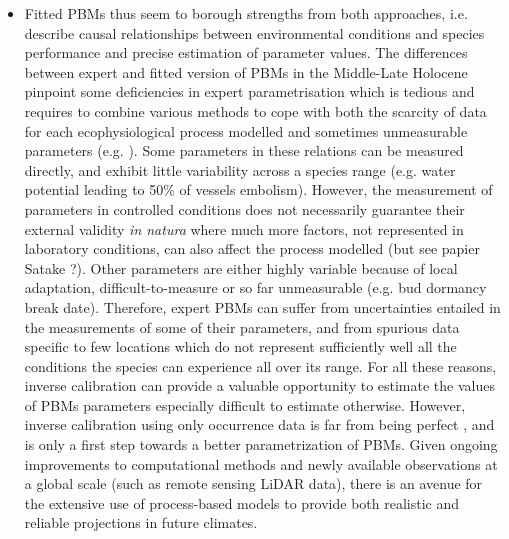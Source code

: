 \documentclass[pdflatex, sn-nature]{sn-jnl}%
\begin{document}
\begin{itemize}
\item Fitted PBMs thus seem to borough strengths from both approaches, i.e. describe causal relationships between environmental conditions and species performance and precise estimation of parameter values. The differences between expert and fitted version of PBMs in the Middle-Late Holocene pinpoint some deficiencies in expert parametrisation which is tedious and requires to combine various methods to cope with both the scarcity of data for each ecophysiological process modelled and sometimes unmeasurable parameters (e.g. \citep{DeCaceres2023}).  Some parameters in these relations can be measured directly, and exhibit little variability across a species range (e.g. water potential leading to 50\% of vessels embolism). However, the measurement of parameters in controlled conditions does not necessarily guarantee their external validity \emph{in natura} \cite{Asse2020} where much more factors, not represented in laboratory conditions, can also affect the process modelled (but see papier Satake ?). Other parameters are either highly variable because of local adaptation,  difficult-to-measure or so far unmeasurable (e.g. bud dormancy break date). Therefore, expert PBMs can suffer from uncertainties entailed in the measurements of some of their parameters, and from spurious data specific to few locations which do not represent sufficiently well all the conditions the species can experience all over its range. For all these reasons, inverse calibration can provide a valuable opportunity to estimate the values of PBMs parameters especially difficult to estimate otherwise. However, inverse calibration using only occurrence data is far from being perfect \cite{VanderMeersch2023}, and is only a first step towards a better parametrization of PBMs. Given ongoing improvements to computational methods and newly available observations at a global scale (such as remote sensing LiDAR data), there is an avenue for the extensive use of process-based models to provide both realistic and reliable projections in future climates.


\end{itemize}
\end{document}
